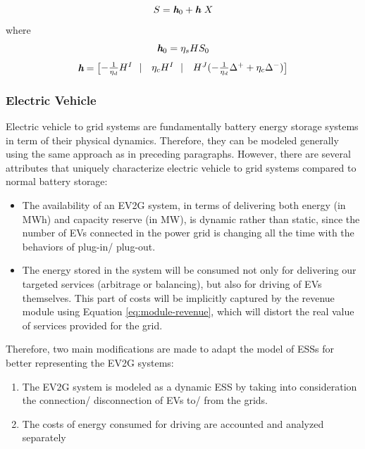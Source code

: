 \begin{equation}
\label{eq:state-ESS-M-1}
S = \textit{\textbf{h}}_0 + \textit{\textbf{h}}~X
\end{equation}
where
\begin{equation}
\label{eq:state-ESS-M-2}
\textit{\textbf{h}}_0 =  \eta_s H S_0
\end{equation}
\begin{equation}
\label{eq:state-ESS-M-3}
\textit{\textbf{h}} = \begin{bmatrix}
-\frac{1}{\eta_d} H^I~~|& \eta_c H^I~~|& H^J (-\frac{1}{\eta_d} \Delta^{+} + \eta_c \Delta^{-})
\end{bmatrix}
\end{equation}
\subsubsection{Electric Vehicle}

Electric vehicle to grid systems are fundamentally battery energy storage systems in term of their physical dynamics. Therefore, they can be modeled generally using the same approach as in preceding paragraphs. However, there are several attributes that uniquely characterize electric vehicle to grid systems compared to normal battery storage:

\begin{itemize}
	\item The availability of an EV2G system, in terms of delivering both energy (in MWh) and capacity reserve (in MW), is dynamic rather than static, since the number of EVs connected in the power grid is changing all the time with the behaviors of plug-in/ plug-out.
	\item The energy stored in the system will be consumed not only for delivering our targeted services (arbitrage or balancing), but also for driving of EVs themselves. This part of costs will be implicitly captured by the revenue module using Equation \eqref{eq:module-revenue}, which will distort the real value of services provided for the grid. 
\end{itemize}

Therefore, two main modifications are made to adapt the model of ESSs for better representing the EV2G systems: 

\begin{enumerate}
	\item The EV2G system is modeled as a dynamic ESS by taking into consideration the connection/ disconnection of EVs to/ from the grids.
	\item The costs of energy consumed for driving are accounted and analyzed separately
\end{enumerate}

